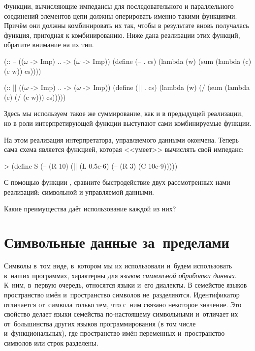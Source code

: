 Функции, вычисляющие импедансы для последовательного и параллельного соединений элементов цепи должны оперировать именно такими функциями. Причём они должны комбинировать их так, чтобы в результате вновь получалась функция, пригодная к комбинированию. Ниже дана реализации этих функций, обратите внимание на их тип.
\begin{Definition}[emph={cs,c,w}]
(:: -- (($\omega$ -> Imp) .. -> ($\omega$ -> Imp))
  (define (-- . cs) 
    (lambda (w) (sum (lambda (c) (c w)) cs))))

(:: || (($\omega$ -> Imp) .. -> ($\omega$ -> Imp))
  (define (|| . cs) 
    (lambda (w) (/ (sum (lambda (c) (/ (c w))) cs)))))
\end{Definition}
Здесь мы используем такое же суммирование, как и в предыдущей реализации, но в роли интерпретирующей функции  выступают сами комбинируемые функции.

На этом реализация интерпретатора, управляемого данными окончена. Теперь сама схема является функцией, которая <<умеет>> вычислять свой импеданс:
\begin{SchemeCode}
> (define S
    (-- (R 10)
        (|| (L 0.5e-6)
            (-- (R 3)
                (C 10e-9)))))
\end{SchemeCode}

\begin{Assignment}
 С помощью функции , сравните быстродействие двух рассмотренных нами реализаций: символьной и управляемой данными.

 Какие преимущества даёт использование каждой из них?
\end{Assignment}

\section{Символьные данные \mbox{за~пределами~\Scheme}}%
Символы в~том виде, в~котором мы их использовали и~будем использовать в~наших программах, характерны для \emph{языков символьной обработки данных}. К~ним, в~первую очередь, относятся языки  \Lisp и~его диалекты.
В семействе языков \Lisp пространство имён и~пространство символов не~разделяются. Идентификатор отличается от~символа только тем, что с~ним связано некоторое значение. Это свойство делает языки семейства \Lisp по-настоящему символьными и~отличает их от~большинства других языков программирования (в том числе и~функциональных), где пространство имён переменных и~пространство символов или строк разделены.

